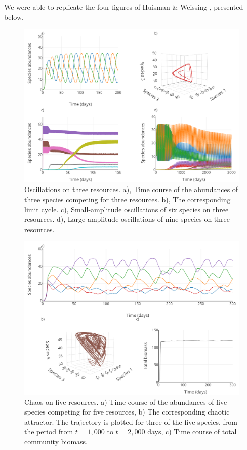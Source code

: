 We were able to replicate the four figures of Huisman \& Weissing \cite{1999:Huisman}, presented below. 

\begin{figure}[H]
\begin{center} 
 \includegraphics[width=1\textwidth]{../Code/Figures/Figure_1.pdf}
  \caption{Oscillations on three resources. a), Time course of the abundances of three species competing for three resources. b), The corresponding limit cycle. c), Small-amplitude oscillations of six species on three resources. d), Large-amplitude oscillations of nine species on three resources.}
  \label{figures:Fig1}
\end{center}
\end{figure}

\begin{figure}[H]
\begin{center} 
 \includegraphics[width=1\textwidth]{../Code/Figures/Figure_2.pdf}
  \caption{Chaos on five resources. a) Time course of the abundances of five species competing for five resources, b) The corresponding chaotic attractor. The trajectory is plotted for three of the five species, from the period from $t= 1,000$ to $t=2,000$ days, c) Time course of total community biomass.}
  \label{figures:Fig2}
\end{center}
\end{figure}

